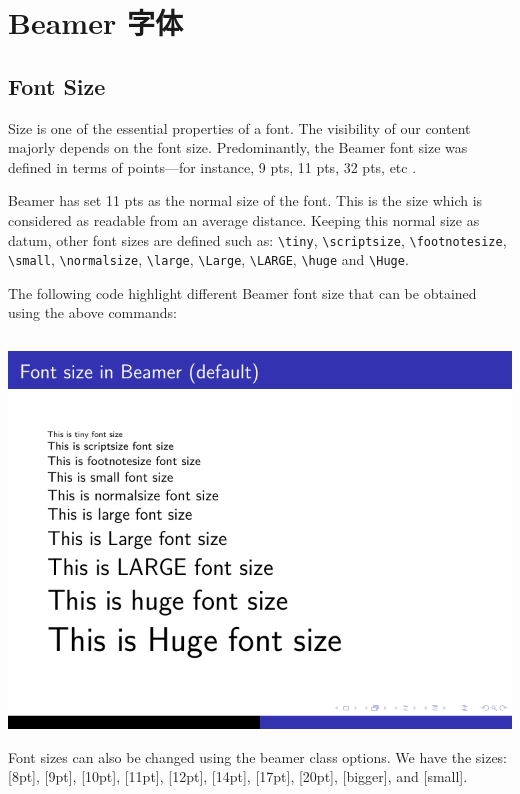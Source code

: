 \section{Beamer 字体}

\subsection{Font Size}

Size is one of the essential properties of a font. The visibility of our content majorly depends on the font size. Predominantly, the Beamer font size was defined in terms of points—for instance, 9 pts, 11 pts, 32 pts, etc .

Beamer has set 11 pts as the normal size of the font. This is the size which is considered as readable from an average distance. Keeping this normal size as datum, other font sizes are defined such as: 
\verb|\tiny|, \verb|\scriptsize|, \verb|\footnotesize|, \verb|\small|, \verb|\normalsize|, \verb|\large|, \verb|\Large|, \verb|\LARGE|, \verb|\huge| and \verb|\Huge|.

The following code highlight different Beamer font size that can be obtained using the above commands:

\inputminted[linenos=true]{latex}{examples/beamer/font-size.tex}

\includegraphics{examples/beamer/font-size.pdf}

Font sizes can also be changed using the beamer class options. We have the sizes: [8pt], [9pt], [10pt], [11pt], [12pt], [14pt], [17pt], [20pt], [bigger], and [small].

